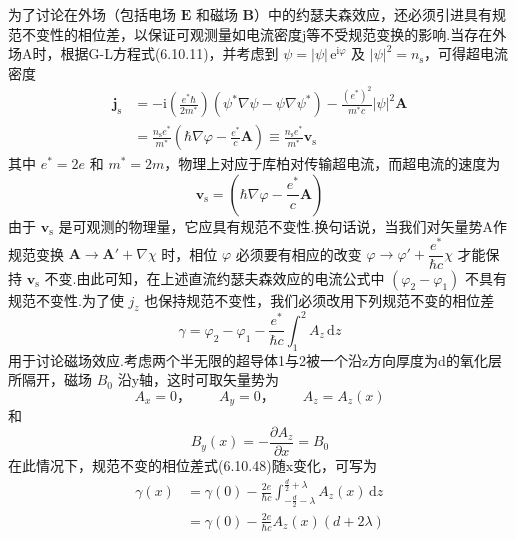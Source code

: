 为了讨论在外场（包括电场 $\boldsymbol{E}$ 和磁场 $\boldsymbol{B}$）中的约瑟夫森效应，还必须引进具有规范不变性的相位差，以保证可观测量如电流密度j等不受规范变换的影响.当存在外场A时，根据G-L方程式(6.10.11)，并考虑到 $\psi=|\psi|\,\mathrm{e}^{\mathrm{i}\varphi}$ 及 $|\psi|^{2}=n_{\mathrm{s}}$，可得超电流密度
\begin{equation}
\begin{aligned}
  \boldsymbol{j}_{\mathrm{s}}
  &=-\mathrm{i}\left(\frac{e^{*}\hbar}{2m^{*}}\right)
  \left(\psi^{*}\nabla\psi-\psi\nabla\psi^{*}\right)
  -\frac{\left(e^{*}\right)^{2}}{m^{*}c}|\psi|^{2}\boldsymbol{A}\\
  &=\frac{n_{\mathrm{s}}e^{*}}{m^{*}}
  \left(\hbar\nabla\varphi-\frac{e^{*}}{c}\boldsymbol{A}\right)
  \equiv\frac{n_{\mathrm{s}}e^{*}}{m^{*}}\boldsymbol{v}_{\mathrm{s}}
\end{aligned}
\end{equation}
其中 $e^{*}=2e$ 和 $m^{*}=2m$，物理上对应于库柏对传输超电流，而超电流的速度为
\begin{equation}
  \boldsymbol{v}_{\mathrm{s}}
  =\left(\hbar\nabla\varphi-\frac{e^{*}}{c}\boldsymbol{A}\right)
\end{equation}
由于 $\boldsymbol{v}_{\mathrm{s}}$ 是可观测的物理量，它应具有规范不变性.换句话说，当我们对矢量势A作规范变换
$\boldsymbol{A}\to\boldsymbol{A}'+\nabla\chi$ 时，相位 $\varphi$ 必须要有相应的改变
$\varphi\to\varphi'+\dfrac{e^{*}}{\hbar c}\chi$
才能保持 $\boldsymbol{v}_{\mathrm{s}}$ 不变.由此可知，在上述直流约瑟夫森效应的电流公式中 $\left(\varphi_{2}-\varphi_{1}\right)$ 不具有规范不变性.为了使 $j_{z}$ 也保持规范不变性，我们必须改用下列规范不变的相位差
\begin{equation}
  \gamma=\varphi_{2}-\varphi_{1}
  -\frac{e^{*}}{\hbar c}\int_{1}^{2}A_{z}\,\mathrm{d}z
\end{equation}
用于讨论磁场效应.考虑两个半无限的超导体1与2被一个沿z方向厚度为d的氧化层所隔开，磁场 $B_{0}$ 沿y轴，这时可取矢量势为
\begin{equation*}
  A_{x}=0\text{，}\qquad A_{y}=0\text{，}\qquad A_{z}=A_{z}(x)
\end{equation*}
和
\begin{equation*}
  B_{y}(x)=-\frac{\partial A_{z}}{\partial x}=B_{0}
\end{equation*}
在此情况下，规范不变的相位差式(6.10.48)随x变化，可写为
\begin{equation*}
\begin{aligned}
  \gamma(x)&=\gamma(0)-\frac{2e}{\hbar c}
  \int_{-\frac{d}{2}-\lambda}^{\frac{d}{2}+\lambda}
  A_{z}(x)\,\mathrm{d}z\\
  &=\gamma(0)-\frac{2e}{\hbar c}A_{z}(x)\left(d+2\lambda\right)
\end{aligned}
\end{equation*}
